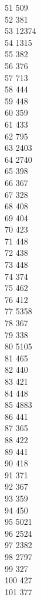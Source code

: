 { 51	509 \\
 52	381 \\
 53	12374 \\
 54	1315 \\
 55	382 \\
 56	376 \\
 57	713 \\
 58	444 \\
 59	448 \\
 60	359 \\
 61	433 \\
 62	795 \\
 63	2403 \\
 64	2740 \\
 65	398 \\
 66	367 \\
 67	328 \\
 68	408 \\
 69	404 \\
 70	423 \\
 71	448 \\
 72	438 \\
 73	448 \\
 74	374 \\
 75	462 \\
 76	412 \\
 77	5358 \\
 78	367 \\
 79	338 \\
 80	5105 \\
 81	465 \\
 82	440 \\
 83	421 \\
 84	448 \\
 85	4883 \\
 86	441 \\
 87	365 \\
 88	422 \\
 89	441 \\
 90	418 \\
 91	371 \\
 92	367 \\
 93	359 \\
 94	450 \\
 95	5021 \\
 96	2524 \\
 97	2382 \\
 98	2797 \\
 99	327 \\
 100	427 \\
 101	377 \\
}
